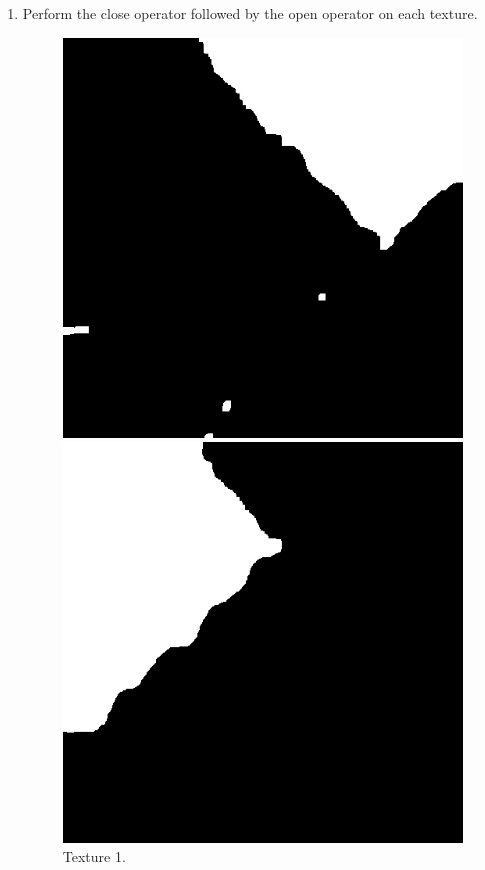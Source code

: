 \documentclass[12pt,a4paper,notitlepage,oneside,amsmath,amssymb]{article}
\begin{document}
\begin{CJK*}{UTF8}{bkai}
\begin{enumerate}[label=(\alph*)]
\begin{enumerate}
	\item Perform the close operator followed by the open operator on each texture.

	\begin{figure}[hbt!]
		\centering
		\begin{minipage}{.25\textwidth}
			\centering
			\includegraphics[width=.9\linewidth]{sample2_texture1_1}
			\caption*{Texture 1.}
		\end{minipage}%
		\begin{minipage}{.25\textwidth}
			\centering
			\includegraphics[width=.9\linewidth]{sample2_texture2_1}

\end{minipage}
\end{figure}
\end{enumerate}
\end{enumerate}
\end{CJK*}
\end{document}
